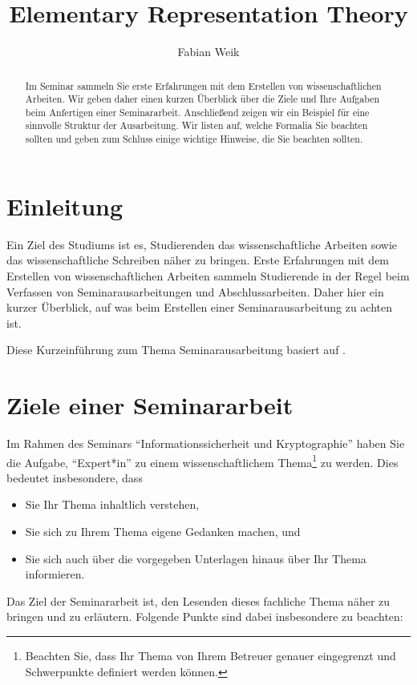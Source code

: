 \documentclass[lang=english]{secseminar}
\title{Elementary Representation Theory}
\author{Fabian Weik}
\begin{document}
\begin{abstract}
Im Seminar sammeln Sie erste Erfahrungen mit dem Erstellen von wissenschaftlichen Arbeiten.
Wir geben daher einen kurzen Überblick über die Ziele und Ihre Aufgaben beim Anfertigen einer
Seminararbeit.
Anschließend zeigen wir ein Beispiel für eine sinnvolle Struktur der Ausarbeitung.
Wir listen auf, welche Formalia Sie beachten sollten und geben zum Schluss einige wichtige Hinweise,
die Sie beachten sollten.
\end{abstract}

\section{Einleitung}
Ein Ziel des Studiums ist es, Studierenden das wissenschaftliche Arbeiten sowie
das wissenschaftliche Schreiben näher zu bringen. Erste Erfahrungen mit dem
Erstellen von wissenschaftlichen Arbeiten sammeln Studierende in der Regel
beim Verfassen von Seminarausarbeitungen und Abschlussarbeiten. Daher hier ein
kurzer Überblick, auf was beim Erstellen einer Seminarausarbeitung zu achten
ist.

\medskip Diese Kurzeinführung zum Thema Seminarausarbeitung basiert auf \cite{LIB,BOH07,KAR}.


\section{Ziele einer Seminararbeit}
Im Rahmen des Seminars ``Informationssicherheit und Kryptographie'' haben Sie die Aufgabe,
``Expert*in'' zu einem wissenschaftlichem Thema\footnote{Beachten Sie, dass Ihr Thema von Ihrem
Betreuer genauer eingegrenzt und Schwerpunkte definiert werden können.} zu werden. Dies bedeutet
insbesondere, dass
\begin{itemize}
\item Sie Ihr Thema inhaltlich verstehen,
\item Sie sich zu Ihrem Thema eigene Gedanken machen, und
\item Sie sich auch über die vorgegeben Unterlagen hinaus über Ihr Thema informieren.
\end{itemize}


Das Ziel der Seminararbeit ist, den Lesenden dieses fachliche Thema näher zu bringen und zu
erläutern. Folgende Punkte sind dabei insbesondere zu beachten:
\end{document}
